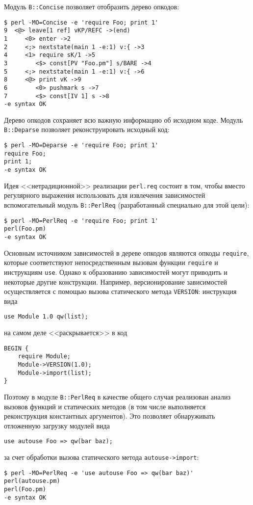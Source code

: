 \documentclass[russian,a4paper,12pt,titlepage]{article}
\begin{document}
Модуль \verb|B::Concise| позволяет отобразить дерево опкодов:
\begin{verbatim}
$ perl -MO=Concise -e 'require Foo; print 1'
9  <@> leave[1 ref] vKP/REFC ->(end)
1     <0> enter ->2
2     <;> nextstate(main 1 -e:1) v:{ ->3
4     <1> require sK/1 ->5
3        <$> const[PV "Foo.pm"] s/BARE ->4
5     <;> nextstate(main 1 -e:1) v:{ ->6
8     <@> print vK ->9
6        <0> pushmark s ->7
7        <$> const[IV 1] s ->8
-e syntax OK
\end{verbatim}

Дерево опкодов сохраняет всю важную информацию об исходном коде.
Модуль \verb|B::Deparse| позволяет реконструировать исходный код:
\begin{verbatim}
$ perl -MO=Deparse -e 'require Foo; print 1'
require Foo;
print 1;
-e syntax OK
\end{verbatim}

Идея <<нетрадиционной>> реализации \verb|perl.req| состоит в том, чтобы вместо регулярного выражения
использовать для извлечения зависимостей вспомогательный модуль \verb|B::PerlReq| (разработанный специально
для этой цели):
\begin{verbatim}
$ perl -MO=PerlReq -e 'require Foo; print 1'
perl(Foo.pm)
-e syntax OK
\end{verbatim}

Основным источником зависимостей в дереве опкодов являются опкоды \verb|require|, которые соответствуют
непосредственным вызовам функции \verb|require| и инструкциям \verb|use|.  Однако к образованию зависимостей
могут приводить и некоторые другие конструкции.  Например, версионирование зависимостей осуществляется
с помощью вызова статического метода \verb|VERSION|: инструкция вида
\begin{verbatim}
use Module 1.0 qw(list);
\end{verbatim}
на самом деле <<раскрывается>> в код
\begin{verbatim}
BEGIN {
    require Module;
    Module->VERSION(1.0);
    Module->import(list);
}
\end{verbatim}
Поэтому в модуле \verb|B::PerlReq| в качестве общего случая реализован анализ вызовов функций
и статических методов (в том числе выполняется реконструкция константных аргументов).  Это
позволяет обнаруживать отложенную загрузку модулей вида
\begin{verbatim}
use autouse Foo => qw(bar baz);
\end{verbatim}
за счет обработки вызова статического метода \verb|autouse->import|:
\begin{verbatim}
$ perl -MO=PerlReq -e 'use autouse Foo => qw(bar baz)'
perl(autouse.pm)
perl(Foo.pm)
-e syntax OK
\end{verbatim}
\end{document}
